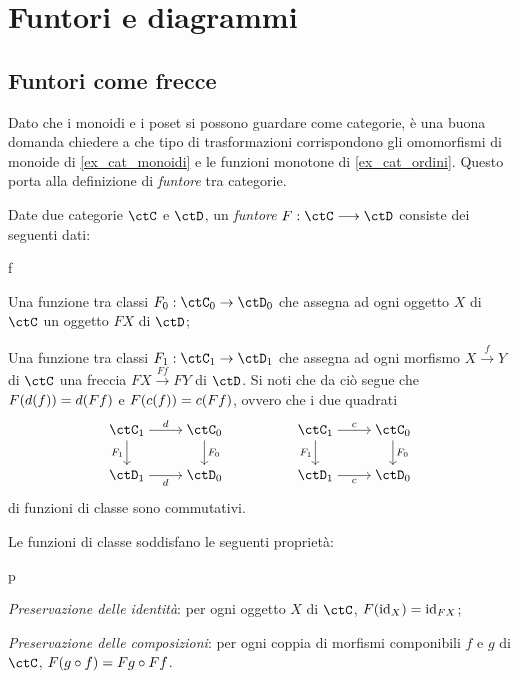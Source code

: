 \section{Funtori e diagrammi}\label{sec_funtori}
\subsection{Funtori come frecce}
Dato che i monoidi e i poset si possono guardare come categorie, è una buona domanda chiedere a che tipo di trasformazioni corrispondono gli omomorfismi di monoide di \ref{ex_cat_monoidi} e le funzioni monotone di \ref{ex_cat_ordini}. Questo porta alla definizione di \emph{funtore} tra categorie.
\begin{definition}[Funtore]\label{def_funtore}
	Date due categorie \(\ctC\) e \(\ctD\), un \emph{funtore} \(F:\ctC\fun\ctD\) consiste dei seguenti dati:
	\begin{enumtag}{f}
		\item \label{f_1} Una funzione tra classi \(F_0 : \ctC_0\to\ctD_0\) che assegna ad ogni oggetto \(X\) di \(\ctC\) un oggetto \(FX\) di \(\ctD\);
		\item \label{f_2} Una funzione tra classi \(F_1 : \ctC_1\to\ctD_1\) che assegna ad ogni morfismo \(X \xrightarrow{f} Y\) di \(\ctC\) una freccia \(FX \xrightarrow{Ff} FY\) di \(\ctD\). Si noti che da ciò segue che \(F(d(f))=d(Ff)\) e \(F(c(f))=c(Ff)\), ovvero che i due quadrati
		\[\begin{tikzcd}[cramped]
				{\ctC_1} & {\ctC_0} && {\ctC_1} & {\ctC_0} \\
				{\ctD_1} & {\ctD_0} && {\ctD_1} & {\ctD_0}
				\arrow["d", from=1-1, to=1-2]
				\arrow["{{F_1}}"', from=1-1, to=2-1]
				\arrow["{{F_0}}", from=1-2, to=2-2]
				\arrow["c", from=1-4, to=1-5]
				\arrow["{F_1}"', from=1-4, to=2-4]
				\arrow["{F_0}", from=1-5, to=2-5]
				\arrow["d"', from=2-1, to=2-2]
				\arrow["c"', from=2-4, to=2-5]
			\end{tikzcd}\]
		di funzioni di classe sono commutativi.
	\end{enumtag}
	Le funzioni di classe soddisfano le seguenti proprietà:
	\begin{enumtag}{p}
		\item \label{p_1} \emph{Preservazione delle identità}: per ogni oggetto \(X\) di \(\ctC\), \(F(\mathrm{id}_X)=\mathrm{id}_{FX}\);
		\item \label{p_2} \emph{Preservazione delle composizioni}: per ogni coppia di morfismi componibili \(f\) e \(g\) di \(\ctC\), \(F(g\circ f)=Fg\circ Ff\).
	\end{enumtag}
\end{definition}
